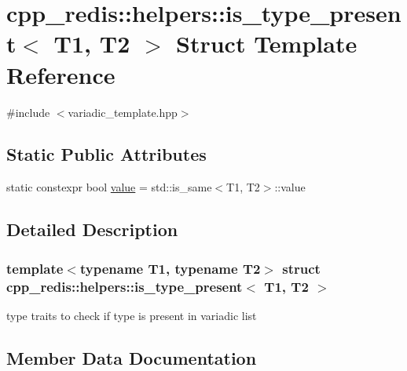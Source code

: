 \hypertarget{structcpp__redis_1_1helpers_1_1is__type__present_3_01_t1_00_01_t2_01_4}{}\section{cpp\+\_\+redis\+:\+:helpers\+:\+:is\+\_\+type\+\_\+present$<$ T1, T2 $>$ Struct Template Reference}
\label{structcpp__redis_1_1helpers_1_1is__type__present_3_01_t1_00_01_t2_01_4}


{\ttfamily \#include $<$variadic\+\_\+template.\+hpp$>$}

\subsection*{Static Public Attributes}
\begin{DoxyCompactItemize}
\item 
static constexpr bool \mbox{\hyperlink{structcpp__redis_1_1helpers_1_1is__type__present_3_01_t1_00_01_t2_01_4_a1dbf43b76ba407caf9bfb35ffdbe55ad}{value}} = std\+::is\+\_\+same$<$T1, T2$>$\+::value
\end{DoxyCompactItemize}


\subsection{Detailed Description}
\subsubsection*{template$<$typename T1, typename T2$>$\newline
struct cpp\+\_\+redis\+::helpers\+::is\+\_\+type\+\_\+present$<$ T1, T2 $>$}

type traits to check if type is present in variadic list 

\subsection{Member Data Documentation}
\mbox{\label{structcpp__redis_1_1helpers_1_1is__type__present_3_01_t1_00_01_t2_01_4_a1dbf43b76ba407caf9bfb35ffdbe55ad}} 
